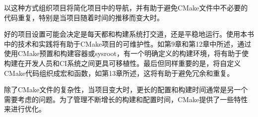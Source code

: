 以这种方式组织项目将简化项目中的导航，并有助于避免CMake文件中不必要的代码重复，特别是当项目随着时间的推移而变大时。

好的项目设置可能会决定是每天都和构建系统打交道，还是平稳地运行。使用本书中的技术和实践将有助于CMake项目的可维护性。如第9章和第12章中所述，通过使用CMake预置和构建容器或sysroot，有一个明确定义的构建环境，将有助于使构建在开发人员和CI系统之间更具可移植性。最后但同样重要的是，将自定义CMake代码组织成宏和函数，如第13章所述，这将有助于避免冗余和重复。

除了CMake文件的复杂性，当项目变大时，更长的配置和构建时间通常是另一个需要考虑的问题。为了管理不断增长的构建和配置时间，CMake提供了一些特性来进行优化。


















